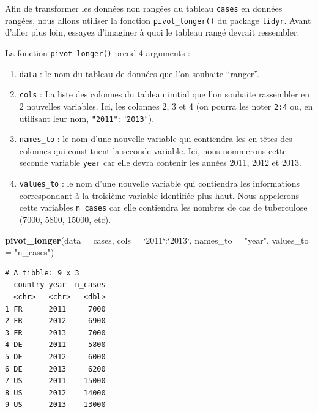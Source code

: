\documentclass[
  a4paper,
]{article}
\newenvironment{Shaded}{\begin{snugshade}}{\end{snugshade}}
\newcommand{\DataTypeTok}[1]{\textcolor[rgb]{0.00,0.34,0.68}{#1}}
\newcommand{\KeywordTok}[1]{\textcolor[rgb]{0.12,0.11,0.11}{\textbf{#1}}}
\newcommand{\NormalTok}[1]{\textcolor[rgb]{0.12,0.11,0.11}{#1}}
\newcommand{\OperatorTok}[1]{\textcolor[rgb]{0.12,0.11,0.11}{#1}}
\newcommand{\StringTok}[1]{\textcolor[rgb]{0.75,0.01,0.01}{#1}}
\providecommand{\tightlist}{%
  \setlength{\itemsep}{0pt}\setlength{\parskip}{0pt}}
\begin{document}
Afin de transformer les données non rangées du tableau \texttt{cases} en données rangées, nous allons utiliser la fonction \texttt{pivot\_longer()} du package \texttt{tidyr}. Avant d'aller plus loin, essayez d'imaginer à quoi le tableau rangé devrait ressembler.

La fonction \texttt{pivot\_longer()} prend 4 arguments :

\begin{enumerate}
\def\labelenumi{\arabic{enumi}.}
\tightlist
\item
  \texttt{data} : le nom du tableau de données que l'on souhaite ``ranger''.
\item
  \texttt{cols} : La liste des colonnes du tableau initial que l'on souhaite rassembler en 2 nouvelles variables. Ici, les colonnes 2, 3 et 4 (on pourra les noter \texttt{2:4} ou, en utilisant leur nom, \texttt{"2011":"2013"}).
\item
  \texttt{names\_to} : le nom d'une nouvelle variable qui contiendra les en-têtes des colonnes qui constituent la seconde variable. Ici, nous nommerons cette seconde variable \texttt{year} car elle devra contenir les années 2011, 2012 et 2013.
\item
  \texttt{values\_to} : le nom d'une nouvelle variable qui contiendra les informations correspondant à la troisième variable identifiée plus haut. Nous appelerons cette variables \texttt{n\_cases} car elle contiendra les nombres de cas de tuberculose (7000, 5800, 15000, etc).
\end{enumerate}

\begin{Shaded}
\begin{Highlighting}[]
\KeywordTok{pivot_longer}\NormalTok{(}\DataTypeTok{data =}\NormalTok{ cases, }
             \DataTypeTok{cols =} \StringTok{`}\DataTypeTok{2011}\StringTok{`}\OperatorTok{:}\StringTok{`}\DataTypeTok{2013}\StringTok{`}\NormalTok{, }
             \DataTypeTok{names_to =} \StringTok{"year"}\NormalTok{, }
             \DataTypeTok{values_to =} \StringTok{"n_cases"}\NormalTok{)}
\end{Highlighting}
\end{Shaded}

\begin{verbatim}
# A tibble: 9 x 3
  country year  n_cases
  <chr>   <chr>   <dbl>
1 FR      2011     7000
2 FR      2012     6900
3 FR      2013     7000
4 DE      2011     5800
5 DE      2012     6000
6 DE      2013     6200
7 US      2011    15000
8 US      2012    14000
9 US      2013    13000
\end{verbatim}
\end{document}
